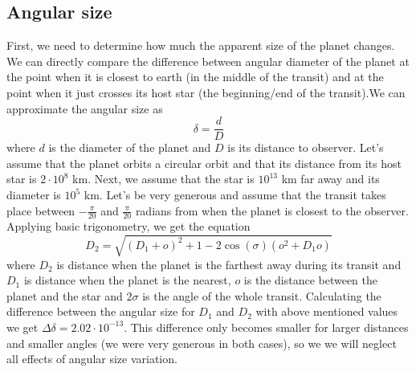 \documentclass[10pt]{article}
\numberwithin{equation}{subsection}
\begin{document}
\subsection{Angular size}
First, we need to determine how much the apparent size of the planet changes.
We can directly compare the difference between angular diameter of the planet at the 
point when it is closest to earth (in the middle of the transit) and at the point when
it just crosses its host star (the beginning/end of the transit).We can approximate
the angular size as
\begin{equation}
  \delta = \frac{d}{D}
  \label{eq:angular-size}
\end{equation}
where $d$ is the diameter of the planet and $D$ is its distance to observer.
Let's assume that the planet orbits a circular orbit and that its distance from its
host star is $2\cdot10^8$ km. Next, we assume that the star is $10^{13}$ km far away
and its diameter is $10^5$ km. Let's be very generous and assume that the transit takes
place between $-\frac{\pi}{20}$ and $\frac{\pi}{20}$ radians from when the planet is
closest to the observer. Applying basic trigonometry, we get the equation
\begin{equation}
  D_2 = \sqrt{(D_1 + o)^2 + 1 -2 \cos(\sigma)(o^2 + D_1o)}
  \label{eq:D2}
\end{equation}
where $D_2$ is distance when the planet is the farthest away during its transit and $D_1$
is distance when the planet is the nearest, $o$ is the distance between the planet and
the star and $2\sigma$ is the angle of the whole transit. Calculating the difference
between the angular size for $D_1$ and $D_2$ with above mentioned values we get
$\Delta\delta = 2.02\cdot10^{-13}$.
This difference only becomes smaller for larger distances and smaller angles (we were very
generous in both cases), so we we will neglect all effects of angular size variation.
\end{document}
